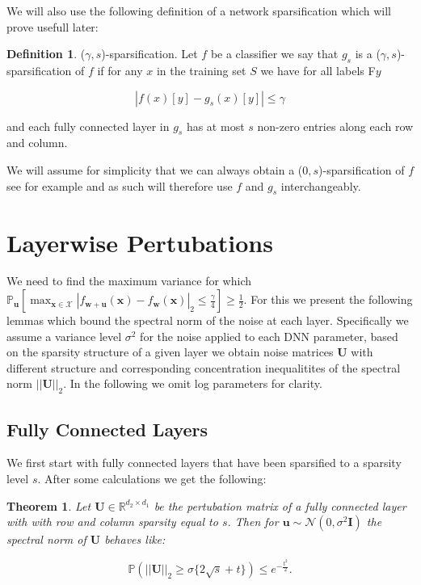 \documentclass{article} %
\newtheorem{theorem}{Theorem}[section]
\theoremstyle{definition}
\newtheorem{definition}{Definition}[section]
\begin{document}
We will also use the following definition of a network sparsification which will prove usefull later:

\begin{definition}
($\gamma,s$)-sparsification. Let $f$ be a classifier we say that $g_{s}$ is a ($\gamma,s$)-sparsification of $f$ if for any $x$ in the training set $S$ we have for all labels F$y$

\begin{equation}
|f(x)[y] -g_s(x)[y]|\leq \gamma
\end{equation}

and each fully connected layer in $g_{s}$ has at most $s$ non-zero entries along each row and column.
\end{definition}

We will assume for simplicity that we can always obtain a ($0,s$)-sparsification of $f$ see for example \citet{han2015learning}\citet{dong2017learning}\citet{pitas2018feta} and as such will therefore use $f$ and $g_{s}$ interchangeably.

\section{Layerwise Pertubations}
We need to find the maximum variance for which $\mathbb{P}_{\boldsymbol{u}}[\max_{\boldsymbol{x \in \mathcal{X}}} |f_{\boldsymbol{w}+\boldsymbol{u} }(\boldsymbol{x})-f_{\boldsymbol{w}}(\boldsymbol{x})|_2 \leq \frac{\gamma}{4} ] \geq \frac{1}{2}$. For this we present the following lemmas which bound the spectral norm of the noise at each layer. Specifically we assume a variance level $\sigma^2$ for the noise applied to each DNN parameter, based on the sparsity structure of a given layer we obtain noise matrices $\boldsymbol{U}$ with different structure and corresponding concentration inequalitites of the spectral norm $||\boldsymbol{U}||_2$. In the following we omit log parameters for clarity. 

\subsection{Fully Connected Layers}
We first start with fully connected layers that have been sparsified to a sparsity level $s$. After some calculations we get the following: 
\begin{theorem}
Let $\boldsymbol{U} \in \mathbb{R}^{d_2 \times d_1}$ be the pertubation matrix of a fully connected layer with with row and column sparsity equal to $s$. Then for $\boldsymbol{u} \sim \mathcal{N}(0,\sigma^2 \boldsymbol{I})$ the spectral norm of $\boldsymbol{U}$ behaves like:


\begin{equation}
\mathbb{P}(||\boldsymbol{U}||_2  \geq \sigma \{ 2\sqrt{s} + t\}) \leq e^{-\frac{t^2}{2}}.
\end{equation}

\end{theorem}
\end{document}
